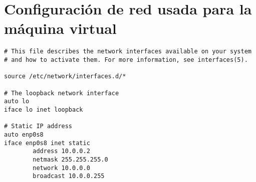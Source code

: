 

\renewcommand{\appendixname}{Apéndices}
\renewcommand{\appendixtocname}{Apéndices}
\renewcommand{\appendixpagename}{Apéndices}



\pagestyle{plain}

\appendix
\addappheadtotoc



\thispagestyle{plain} \section{Configuración de red usada para la máquina virtual}
\begin{lstlisting}[breaklines,frame=single]
# This file describes the network interfaces available on your system
# and how to activate them. For more information, see interfaces(5).

source /etc/network/interfaces.d/*

# The loopback network interface
auto lo
iface lo inet loopback

# Static IP address
auto enp0s8
iface enp0s8 inet static
        address 10.0.0.2  
        netmask 255.255.255.0
        network 10.0.0.0
        broadcast 10.0.0.255
\end{lstlisting}


\clearpage
\restoregeometry 
